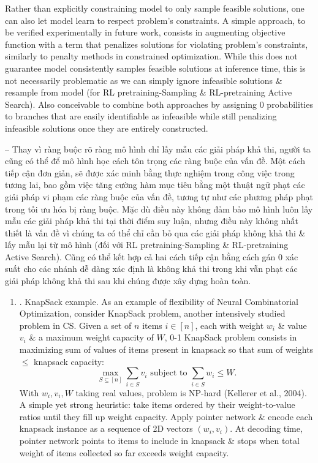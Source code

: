 \documentclass{article}
\begin{document}
\begin{itemize}
    Rather than explicitly constraining model to only sample feasible solutions, one can also let model learn to respect problem's constraints. A simple approach, to be verified experimentally in future work, consists in augmenting objective function with a term that penalizes solutions for violating problem's constraints, similarly to penalty methods in constrained optimization. While this does not guarantee model consistently samples feasible solutions at inference time, this is not necessarily problematic as we can simply ignore infeasible solutions \& resample from model (for RL pretraining-Sampling \& RL-pretraining Active Search). Also conceivable to combine both approaches by assigning 0 probabilities to branches that are easily identifiable as infeasible while still penalizing infeasible solutions once they are entirely constructed.
    
    -- Thay vì ràng buộc rõ ràng mô hình chỉ lấy mẫu các giải pháp khả thi, người ta cũng có thể để mô hình học cách tôn trọng các ràng buộc của vấn đề. Một cách tiếp cận đơn giản, sẽ được xác minh bằng thực nghiệm trong công việc trong tương lai, bao gồm việc tăng cường hàm mục tiêu bằng một thuật ngữ phạt các giải pháp vi phạm các ràng buộc của vấn đề, tương tự như các phương pháp phạt trong tối ưu hóa bị ràng buộc. Mặc dù điều này không đảm bảo mô hình luôn lấy mẫu các giải pháp khả thi tại thời điểm suy luận, nhưng điều này không nhất thiết là vấn đề vì chúng ta có thể chỉ cần bỏ qua các giải pháp không khả thi \& lấy mẫu lại từ mô hình (đối với RL pretraining-Sampling \& RL-pretraining Active Search). Cũng có thể kết hợp cả hai cách tiếp cận bằng cách gán 0 xác suất cho các nhánh dễ dàng xác định là không khả thi trong khi vẫn phạt các giải pháp không khả thi sau khi chúng được xây dựng hoàn toàn.
    \begin{enumerate}
        \item {. KnapSack example.} As an example of flexibility of Neural Combinatorial Optimization, consider KnapSack problem, another intensively studied problem in CS. Given a set of $n$ items $i\in[n]$, each with weight $w_i$ \& value $v_i$ \& a maximum weight capacity of $W$, 0-1 KnapSack problem consists in maximizing sum of values of items present in knapsack so that sum of weights $\le$ knapsack capacity:
        \begin{equation*}
            \max_{S\subseteq[n]} \sum_{i\in S} v_i\mbox{ subject to }\sum_{i\in S} w_i\le W.
        \end{equation*}
        With $w_i,v_i,W$ taking real values, problem is NP-hard (Kellerer et al., 2004). A simple yet strong heuristic: take items ordered by their weight-to-value ratios until they fill up weight capacity. Apply pointer network \& encode each knapsack instance as a sequence of 2D vectors $(w_i,v_i)$. At decoding time, pointer network points to items to include in knapsack \& stops when total weight of items collected so far exceeds weight capacity.
        

\end{enumerate}
\end{itemize}
\end{document}
